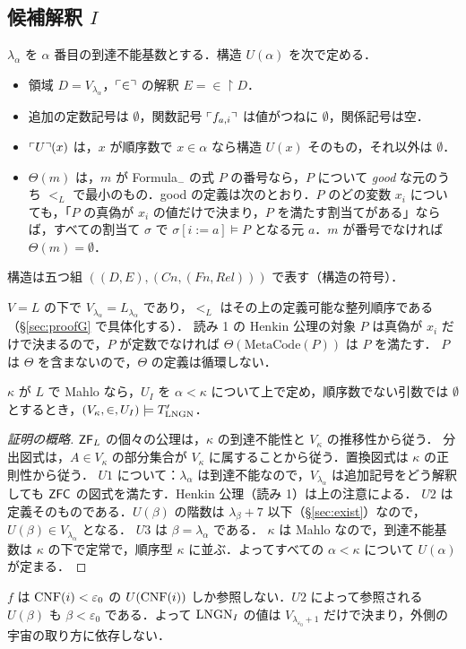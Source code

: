 \subsection{候補解釈 $I$}\label{sec:candidate}
\begin{definition}[候補解釈]\label{def:I}
$\lambda_\alpha$ を $\alpha$ 番目の到達不能基数とする．構造 $U(\alpha)$ を次で定める．
\begin{itemize}
\item 領域 $D=V_{\lambda_\alpha}$，$\ulcorner \in\urcorner$ の解釈 $E=\in\restriction D$．
\item 追加の定数記号は $\emptyset$，関数記号 $\ulcorner f_{a,i}\urcorner$ は値がつねに $\emptyset$，関係記号は空．
\item $\ulcorner U\urcorner(x)$ は，$x$ が順序数で $x\in\alpha$ なら構造 $U(x)$ そのもの，それ以外は $\emptyset$．
\item $\Theta(m)$ は，$m$ が Formula$_-$ の式 $P$ の番号なら，$P$ について \emph{good} な元のうち $<_L$ で最小のもの．good の定義は次のとおり．$P$ のどの変数 $x_i$ についても，「$P$ の真偽が $x_i$ の値だけで決まり，$P$ を満たす割当てがある」ならば，すべての割当て $\sigma$ で $\sigma[i:=a]\models P$ となる元 $a$．$m$ が番号でなければ $\Theta(m)=\emptyset$．
\end{itemize}
構造は五つ組 $((D,E),(Cn,(Fn,Rel)))$ で表す（構造の符号）．
\end{definition}
$V{=}L$ の下で $V_{\lambda_\alpha}=L_{\lambda_\alpha}$ であり，$<_L$ はその上の定義可能な整列順序である（\S\ref{sec:proofG} で具体化する）．
読み 1 の Henkin 公理の対象 $P$ は真偽が $x_i$ だけで決まるので，$P$ が定数でなければ $\Theta(\mathrm{MetaCode}(P))$ は $P$ を満たす．
$P$ は $\Theta$ を含まないので，$\Theta$ の定義は循環しない．

\begin{proposition}\label{prop:model}
$\kappa$ が $L$ で Mahlo なら，$U_I$ を $\alpha<\kappa$ について上で定め，順序数でない引数では $\emptyset$ とするとき，$(V_\kappa,\in,U_I)\models T'_{\mathrm{LNGN}}$．
\end{proposition}
\begin{proof}[証明の概略]
$\mathsf{ZF}_L$ の個々の公理は，$\kappa$ の到達不能性と $V_\kappa$ の推移性から従う．
分出図式は，$A\in V_\kappa$ の部分集合が $V_\kappa$ に属することから従う．置換図式は $\kappa$ の正則性から従う．
$U1$ について：$\lambda_\alpha$ は到達不能なので，$V_{\lambda_\alpha}$ は追加記号をどう解釈しても $\mathsf{ZFC}$ の図式を満たす．Henkin 公理（読み 1）は上の注意による．
$U2$ は定義そのものである．$U(\beta)$ の階数は $\lambda_\beta+7$ 以下（\S\ref{sec:exist}）なので，$U(\beta)\in V_{\lambda_\alpha}$ となる．
$U3$ は $\beta=\lambda_\alpha$ である．
$\kappa$ は Mahlo なので，到達不能基数は $\kappa$ の下で定常で，順序型 $\kappa$ に並ぶ．よってすべての $\alpha<\kappa$ について $U(\alpha)$ が定まる．
\end{proof}

\begin{remark}[局所性]
$f$ は $\mathrm{CNF}(i)<\varepsilon_0$ の $U(\mathrm{CNF}(i))$ しか参照しない．$U2$ によって参照される $U(\beta)$ も $\beta<\varepsilon_0$ である．よって $\mathrm{LNGN}_I$ の値は $V_{\lambda_{\varepsilon_0}+1}$ だけで決まり，外側の宇宙の取り方に依存しない．
\end{remark}
